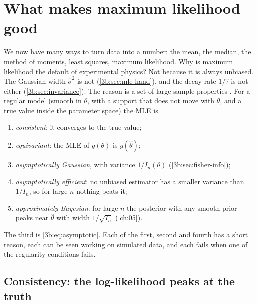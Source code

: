 \section{What makes maximum likelihood good}
\label{3b:sec:properties}

We now have many ways to turn data into a number: the mean, the median,
the method of moments, least squares, maximum likelihood. Why is maximum
likelihood the default of experimental physics? Not because it is always
unbiased. The Gaussian width $\hat\sigma^2$ is not (\cref{3b:sec:mle-hand}),
and the decay rate $1/\hat\tau$ is not either (\cref{3b:sec:invariance}).
The reason is a set of large-sample properties
. For a regular model (smooth in $\theta$, with a support
that does not move with $\theta$, and a true value inside the parameter
space) the MLE is
\begin{enumerate}[label=\arabic*.]
  \item \emph{consistent}: it converges to the true value;
  \item \emph{equivariant}: the MLE of $g(\theta)$ is $g(\hat\theta)$;
  \item \emph{asymptotically Gaussian}, with variance $1/I_n(\theta)$
        (\cref{3b:sec:fisher-info});
  \item \emph{asymptotically efficient}: no unbiased estimator has a
        smaller variance than $1/I_n$, so for large $n$ nothing beats it;
  \item \emph{approximately Bayesian}: for large $n$ the posterior with any
        smooth prior peaks near $\hat\theta$ with width $1/\sqrt{I_n}$
        (\cref{ch:05}).
\end{enumerate}
The third is \eqref{3b:eq:asymptotic}. Each of the first, second and fourth
has a short reason, each can be seen working on simulated data, and each
fails when one of the regularity conditions fails.

\subsection{Consistency: the log-likelihood peaks at the truth}
\label{3b:sec:consistency}

